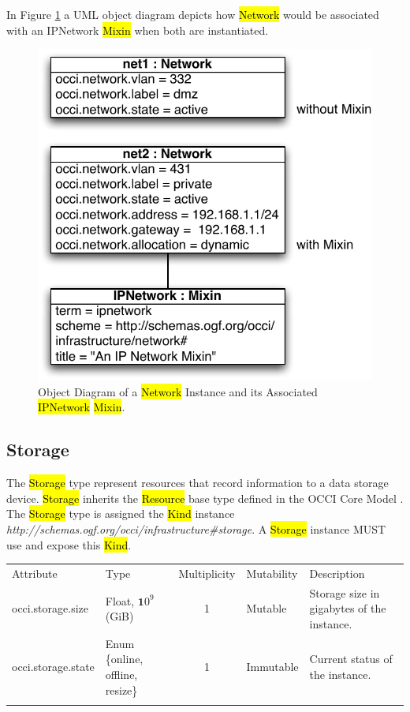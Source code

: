\documentclass[10pt,a4paper]{article}
\begin{document}
In Figure \ref{fig:network_mixin} a UML object diagram depicts how
\hl{Network} would be associated with an IPNetwork \hl{Mixin} when
both are instantiated.

\begin{figure}[!h]
	\centering
	\includegraphics[scale=0.5]{figs/infrastructure_mixins_obj_dia1_network}
	\caption{Object Diagram of a \hl{Network} Instance and its 
	Associated \hl{IPNetwork} \hl{Mixin}.}
	\label{fig:network_mixin}
\end{figure}

\subsection{Storage}
The \hl{Storage} type represent resources that record information to a
data storage device.  \hl{Storage} inherits the \hl{Resource} base
type defined in the OCCI Core Model \cite{occi:core}.  The
\hl{Storage} type is assigned the \hl{Kind} instance
\textit{http://schemas.ogf.org/occi/infrastructure\#storage}.  A
\hl{Storage} instance MUST use and expose this \hl{Kind}.

{
	\begin{tabular}{lp{2.8cm}clp{5cm}}
	\toprule
	Attribute&Type&Multi\-plicity&Mutability&Description\\
	\colrule
	occi.storage.size & Float, ${\mathbf 10}^9$ (GiB) & 1 & Mutable 
	& Storage size in gigabytes of the 	instance.\\
	occi.storage.state & Enum \{online, offline, resize\} & 1 & Immutable 
	& Current status of the instance.\\
	\botrule
	\end{tabular}
}
\end{document}
